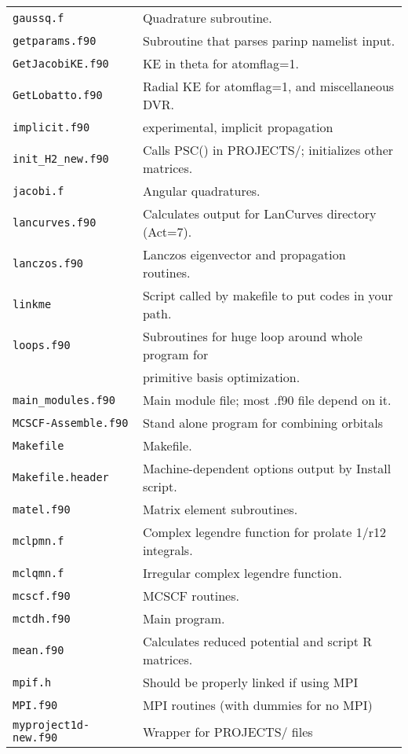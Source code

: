 {\begin{tabular}{ll}
\verb#gaussq.f       #& Quadrature subroutine. \\
\verb#getparams.f90  #& Subroutine that parses parinp namelist input. \\
\verb#GetJacobiKE.f90#& KE in theta for atomflag=1. \\
\verb#GetLobatto.f90 #& Radial KE for atomflag=1, and miscellaneous DVR. \\
\verb#implicit.f90   #& experimental, implicit propagation \\
\verb#init_H2_new.f90#& Calls PSC() in PROJECTS/; initializes other matrices. \\
\verb#jacobi.f       #& Angular quadratures. \\
\verb#lancurves.f90  #& Calculates output for LanCurves directory (Act=7). \\
\verb#lanczos.f90    #& Lanczos eigenvector and propagation routines. \\
\verb#linkme         #& Script called by makefile to put codes in your path. \\
\verb#loops.f90      #& Subroutines for huge loop around whole program for \\
  & \quad primitive basis optimization. \\
\verb#main_modules.f90#& Main module file; most .f90 file depend on it. \\
\verb#MCSCF-Assemble.f90# & Stand alone program for combining orbitals \\
\verb#Makefile       #& Makefile. \\
\verb#Makefile.header#& Machine-dependent options output by Install script. \\
\verb#matel.f90      #& Matrix element subroutines. \\
\verb#mclpmn.f       #& Complex legendre function for prolate 1/r12 integrals. \\
\verb#mclqmn.f       #& Irregular complex legendre function. \\
\verb#mcscf.f90      #& MCSCF routines.  \\
\verb#mctdh.f90      #& Main program. \\
\verb#mean.f90       #& Calculates reduced potential and script R matrices. \\
\verb#mpif.h         #& Should be properly linked if using MPI \\
\verb#MPI.f90        #& MPI routines (with dummies for no MPI) \\
\verb#myproject1d-new.f90#& Wrapper for PROJECTS/ files \\

\end{tabular}}
